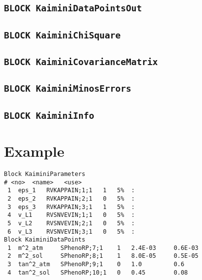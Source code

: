 \documentclass[a4paper,12pt]{article}
\newcommand{\ttt}[1]{\texttt{#1}}
\begin{document}
\subsection*{\ttt{BLOCK KaiminiDataPointsOut}}

\subsection*{\ttt{BLOCK KaiminiChiSquare}}

\subsection*{\ttt{BLOCK KaiminiCovarianceMatrix}}

\subsection*{\ttt{BLOCK KaiminiMinosErrors}}

\subsection*{\ttt{BLOCK KaiminiInfo}}


\appendix

\section{Example}

\begin{Verbatim}[frame=single]
Block KaiminiParameters
# <no>  <name>   <use> 
 1  eps_1   RVKAPPAIN;1;1   1   5%  :
 2  eps_2   RVKAPPAIN;2;1   0   5%  :
 3  eps_3   RVKAPPAIN;3;1   1   5%  :
 4  v_L1    RVSNVEVIN;1;1   0   5%  :
 5  v_L2    RVSNVEVIN;2;1   0   5%  :
 6  v_L3    RVSNVEVIN;3;1   0   5%  :
Block KaiminiDataPoints
 1  m^2_atm     SPhenoRP;7;1    1   2.4E-03     0.6E-03
 2  m^2_sol     SPhenoRP;8;1    1   8.0E-05     0.5E-05
 3  tan^2_atm   SPhenoRP;9;1    0   1.0         0.6
 4  tan^2_sol   SPhenoRP;10;1   0   0.45        0.08
\end{Verbatim}

\pagebreak


\end{document}
